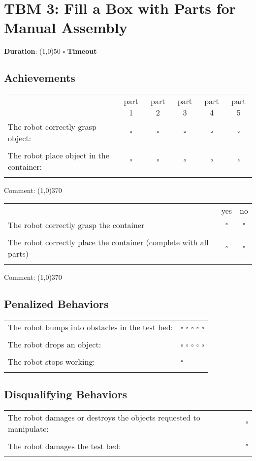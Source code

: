 \section*{TBM 3: Fill a Box with Parts for Manual Assembly}

\noindent \textbf{Duration}: \line(1,0){50} \hspace{0.5cm} $\square$ \textbf{Timeout}

\subsection*{Achievements}
\begin{tabular}{ l c c c c c}
 & part 1 & part 2 & part 3 & part 4 & part 5 \\ 
The robot correctly grasp object: & $\square$ & $\square$ & $\square$ & $\square$ & $\square$\\ \\
The robot place object in the container: & $\square$ & $\square$ & $\square$ & $\square$ & $\square$\\ \\
\end{tabular}

\vspace{0.2cm}
Comment: \line(1,0){370}
\vspace{0.6cm}

\noindent
\begin{tabular}{ l c c}
 & yes & no \\ 
The robot correctly grasp the container & $\square$ & $\square$ \\ \\
The robot correctly place the container (complete with all parts) & $\square$ & $\square$ \\ \\
\end{tabular}

\vspace{0.2cm}
Comment: \line(1,0){370}

\subsection*{Penalized Behaviors}
\begin{tabular}{ l l}
The robot bumps into obstacles in the test bed: & $\square$ $\square$ $\square$ $\square$ $\square$ \\ \\
The robot drops an object: & $\square$ $\square$ $\square$ $\square$ $\square$ \\ \\
The robot stops working: & $\square$ \\ \\


\end{tabular}

\subsection*{Disqualifying Behaviors}
\begin{tabular}{ l c}
The robot damages or destroys the objects requested to manipulate: & $\square$ \\ \\
The robot damages the test bed: & $\square$ \\ \\
\end{tabular}


